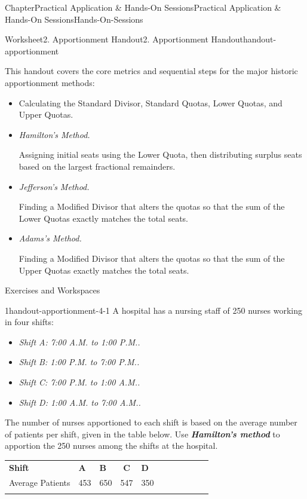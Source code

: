 \documentclass[oneside,10pt,]{book}
\newcommand{\tabularfont}{\relax}
\newcommand{\ptxlistdisc}{\raisebox{0.3ex}{\textbullet}}
\newcommand{\alert}[1]{\textbf{\textit{#1}}}
\newcommand{\lititle}[1]{{\slshape#1}}
\newcommand{\hrulethin}  {\noalign{\hrule height 0.04em}}
\begin{document}
\begin{chapterptx}{Chapter}{Practical Application \& Hands-On Sessions}{}{Practical Application \& Hands-On Sessions}{}{}{Hands-On-Sessions}
\begin{worksheet-section}{Worksheet}{2. Apportionment Handout}{}{2. Apportionment Handout}{}{}{handout-apportionment}
\begin{introduction}{}
This handout covers the core metrics and sequential steps for the major historic apportionment methods:%
\par
%
\begin{itemize}[label=\ptxlistdisc]
\item{}Calculating the Standard Divisor, Standard Quotas, Lower Quotas, and Upper Quotas.%
\item{}\lititle{Hamilton's Method.}\par%
 Assigning initial seats using the Lower Quota, then distributing surplus seats based on the largest fractional remainders.%
\item{}\lititle{Jefferson's Method.}\par%
 Finding a Modified Divisor that alters the quotas so that the sum of the Lower Quotas exactly matches the total seats.%
\item{}\lititle{Adams's Method.}\par%
 Finding a Modified Divisor that alters the quotas so that the sum of the Upper Quotas exactly matches the total seats.%
\end{itemize}
%
\end{introduction}%
Exercises and Workspaces%
\begin{divisionexercise}{1}{}{}{handout-apportionment-4-1}%
A hospital has a nursing staff of 250 nurses working in four shifts:%
\begin{itemize}[label=\ptxlistdisc]
\item{}\lititle{Shift A: 7:00 A.M. to 1:00 P.M..}\par%
%
\item{}\lititle{Shift B: 1:00 P.M. to 7:00 P.M..}\par%
%
\item{}\lititle{Shift C: 7:00 P.M. to 1:00 A.M..}\par%
%
\item{}\lititle{Shift D: 1:00 A.M. to 7:00 A.M..}\par%
%
\end{itemize}
The number of nurses apportioned to each shift is based on the average number of patients per shift, given in the table below. Use \alert{Hamilton's method} to apportion the 250 nurses among the shifts at the hospital.%
\begin{center}%
{\tabularfont%
\begin{tabular}{AlAcAcAcAcA}\hrulethin
{\bfseries{}Shift}&{\bfseries{}A}&{\bfseries{}B}&{\bfseries{}C}&{\bfseries{}D}\tabularnewline\hrulethin
Average Patients&453&650&547&350\tabularnewline\hrulethin

\end{tabular}}
\end{center}
\end{divisionexercise}
\end{worksheet-section}
\end{chapterptx}
\end{document}
